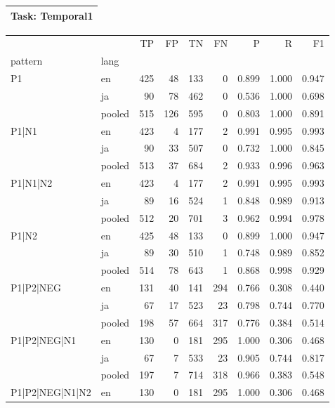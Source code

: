 
\begin{table}[h!]
\centering
\begin{tabular}{p{}}
\toprule
\textbf{Task: Temporal1} \\
\midrule
\end{tabular}
\vspace{10pt}
\begin{tabular}{llrrrrrrr}
\toprule
 &  & TP & FP & TN & FN & P & R & F1 \\
pattern & lang &  &  &  &  &  &  &  \\
\midrule
\multirow[t]{3}{*}{P1} & en & 425 & 48 & 133 & 0 & 0.899 & 1.000 & 0.947 \\
 & ja & 90 & 78 & 462 & 0 & 0.536 & 1.000 & 0.698 \\
 & pooled & 515 & 126 & 595 & 0 & 0.803 & 1.000 & 0.891 \\
\cline{1-9}
\multirow[t]{3}{*}{P1|N1} & en & 423 & 4 & 177 & 2 & 0.991 & 0.995 & 0.993 \\
 & ja & 90 & 33 & 507 & 0 & 0.732 & 1.000 & 0.845 \\
 & pooled & 513 & 37 & 684 & 2 & 0.933 & 0.996 & 0.963 \\
\cline{1-9}
\multirow[t]{3}{*}{P1|N1|N2} & en & 423 & 4 & 177 & 2 & 0.991 & 0.995 & 0.993 \\
 & ja & 89 & 16 & 524 & 1 & 0.848 & 0.989 & 0.913 \\
 & pooled & 512 & 20 & 701 & 3 & 0.962 & 0.994 & 0.978 \\
\cline{1-9}
\multirow[t]{3}{*}{P1|N2} & en & 425 & 48 & 133 & 0 & 0.899 & 1.000 & 0.947 \\
 & ja & 89 & 30 & 510 & 1 & 0.748 & 0.989 & 0.852 \\
 & pooled & 514 & 78 & 643 & 1 & 0.868 & 0.998 & 0.929 \\
\cline{1-9}
\multirow[t]{3}{*}{P1|P2|NEG} & en & 131 & 40 & 141 & 294 & 0.766 & 0.308 & 0.440 \\
 & ja & 67 & 17 & 523 & 23 & 0.798 & 0.744 & 0.770 \\
 & pooled & 198 & 57 & 664 & 317 & 0.776 & 0.384 & 0.514 \\
\cline{1-9}
\multirow[t]{3}{*}{P1|P2|NEG|N1} & en & 130 & 0 & 181 & 295 & 1.000 & 0.306 & 0.468 \\
 & ja & 67 & 7 & 533 & 23 & 0.905 & 0.744 & 0.817 \\
 & pooled & 197 & 7 & 714 & 318 & 0.966 & 0.383 & 0.548 \\
\cline{1-9}
\multirow[t]{3}{*}{P1|P2|NEG|N1|N2} & en & 130 & 0 & 181 & 295 & 1.000 & 0.306 & 0.468 \\

\end{tabular}
\end{table}
